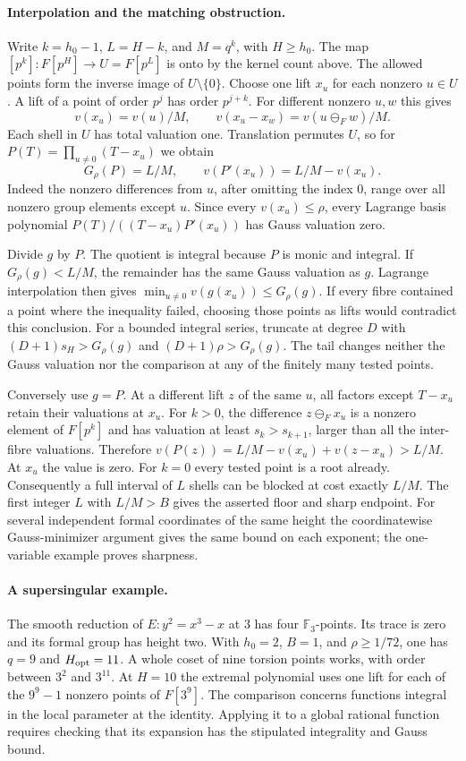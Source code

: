 \paragraph{Interpolation and the matching obstruction.}
Write $k=h_0-1$, $L=H-k$, and $M=q^k$, with $H\ge h_0$.
The map $[p^k]:F[p^H]\longrightarrow U=F[p^L]$ is onto by the kernel
count above. The allowed points form the inverse image of
$U\setminus\{0\}$. Choose one lift $x_u$ for each nonzero $u\in U$.
A lift of a point of order $p^j$ has order $p^{j+k}$. For different
nonzero $u,w$ this gives
\[
 v(x_u)=v(u)/M,\qquad v(x_u-x_w)=v(u\mathbin{\ominus_F}w)/M.
\]
Each shell in $U$ has total valuation one. Translation permutes $U$,
so for $P(T)=\prod_{u\ne0}(T-x_u)$ we obtain
\[
 G_\rho(P)=L/M,\qquad v(P'(x_u))=L/M-v(x_u).
\]
Indeed the nonzero differences from $u$, after omitting the index
$0$, range over all nonzero group elements except $u$. Since every
$v(x_u)\le\rho$, every Lagrange basis polynomial
$P(T)/((T-x_u)P'(x_u))$ has Gauss valuation zero.

Divide $g$ by $P$. The quotient is integral because $P$ is monic and
integral. If $G_\rho(g)<L/M$, the remainder has the same Gauss
valuation as $g$. Lagrange interpolation then gives
$\min_{u\ne0}v(g(x_u))\le G_\rho(g)$. If every fibre contained a point
where the inequality failed, choosing those points as lifts would
contradict this conclusion. For a bounded integral series, truncate at
degree $D$ with $(D+1)s_H>G_\rho(g)$ and $(D+1)\rho>G_\rho(g)$.
The tail changes neither the Gauss valuation nor the comparison at
any of the finitely many tested points.

Conversely use $g=P$. At a different lift $z$ of the same $u$,
all factors except $T-x_u$ retain their valuations at $x_u$.
For $k>0$, the difference $z\mathbin{\ominus_F}x_u$ is a nonzero element
of $F[p^k]$ and has valuation at least $s_k>s_{k+1}$, larger than
all the inter-fibre valuations. Therefore
$v(P(z))=L/M-v(x_u)+v(z-x_u)>L/M$. At $x_u$ the value is zero.
For $k=0$ every tested point is a root already.
Consequently a full interval of $L$ shells can be blocked at cost
exactly $L/M$. The first integer $L$ with $L/M>B$ gives the asserted
floor and sharp endpoint. For several independent formal coordinates of
the same height the coordinatewise Gauss-minimizer argument gives the
same bound on each exponent; the one-variable example proves sharpness.

\paragraph{A supersingular example.}
The smooth reduction of $E:y^2=x^3-x$ at $3$ has four
$\mathbb F_3$-points. Its trace is zero and its formal group has height
two. With $h_0=2$, $B=1$, and $\rho\ge1/72$, one has $q=9$ and
$H_{\rm opt}=11$. A whole coset of nine torsion points works, with
order between $3^2$ and $3^{11}$. At $H=10$ the extremal polynomial
uses one lift for each of the $9^9-1$ nonzero points of $F[3^9]$.
The comparison concerns functions integral in the local parameter at the
identity. Applying it to a global rational function requires checking that
its expansion has the stipulated integrality and Gauss bound.

